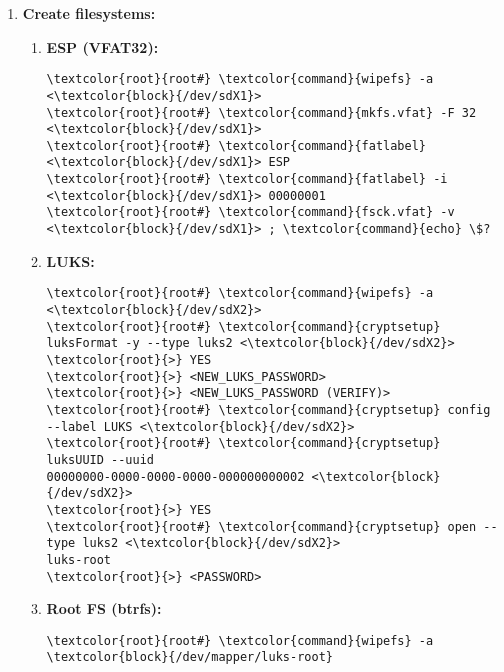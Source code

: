 \documentclass[10pt, a4paper, onecolumn, oneside, titlepage, openany]{book}
\begin{document}
\begin{enumerate}
\begin{enumerate}
        \item \textbf{Name partitions:}
\begin{Verbatim}[commandchars=\\\{\}]
\textcolor{root}{root#} \textcolor{command}{parted} -s <\textcolor{block}{/dev/sdX}> name 1 ESP
\textcolor{root}{root#} \textcolor{command}{parted} -s <\textcolor{block}{/dev/sdX}> name 2 LUKS
\end{Verbatim}
    \end{enumerate}
    \item \textbf{Create filesystems:}
    \begin{enumerate}
        \item \textbf{ESP (VFAT32):}
\begin{Verbatim}[commandchars=\\\{\}]
\textcolor{root}{root#} \textcolor{command}{wipefs} -a <\textcolor{block}{/dev/sdX1}>
\textcolor{root}{root#} \textcolor{command}{mkfs.vfat} -F 32 <\textcolor{block}{/dev/sdX1}>
\textcolor{root}{root#} \textcolor{command}{fatlabel} <\textcolor{block}{/dev/sdX1}> ESP
\textcolor{root}{root#} \textcolor{command}{fatlabel} -i <\textcolor{block}{/dev/sdX1}> 00000001
\textcolor{root}{root#} \textcolor{command}{fsck.vfat} -v <\textcolor{block}{/dev/sdX1}> ; \textcolor{command}{echo} \$?
\end{Verbatim}
        \item \textbf{LUKS:}
\begin{Verbatim}[commandchars=\\\{\}]
\textcolor{root}{root#} \textcolor{command}{wipefs} -a <\textcolor{block}{/dev/sdX2}>
\textcolor{root}{root#} \textcolor{command}{cryptsetup} luksFormat -y --type luks2 <\textcolor{block}{/dev/sdX2}>
\textcolor{root}{>} YES
\textcolor{root}{>} <NEW_LUKS_PASSWORD>
\textcolor{root}{>} <NEW_LUKS_PASSWORD (VERIFY)>
\textcolor{root}{root#} \textcolor{command}{cryptsetup} config --label LUKS <\textcolor{block}{/dev/sdX2}>
\textcolor{root}{root#} \textcolor{command}{cryptsetup} luksUUID --uuid
00000000-0000-0000-0000-000000000002 <\textcolor{block}{/dev/sdX2}>
\textcolor{root}{>} YES
\textcolor{root}{root#} \textcolor{command}{cryptsetup} open --type luks2 <\textcolor{block}{/dev/sdX2}>
luks-root
\textcolor{root}{>} <PASSWORD>
\end{Verbatim}
        \item \textbf{Root FS (btrfs):}
\begin{Verbatim}[commandchars=\\\{\}]
\textcolor{root}{root#} \textcolor{command}{wipefs} -a \textcolor{block}{/dev/mapper/luks-root}

\end{Verbatim}
\end{enumerate}
\end{enumerate}
\end{document}
